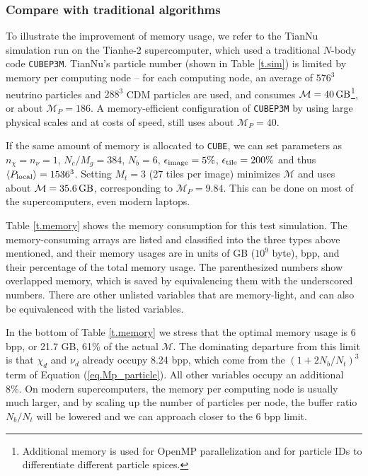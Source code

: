 \documentclass[10pt,twocolumn,preprint]{emulateapj}
\begin{document}
\subsubsection{Compare with traditional algorithms}
To illustrate the improvement of memory usage, we refer to the TianNu simulation \citep{2017NatAs...1E.143Y} run on the Tianhe-2 supercomputer, which used a traditional $N$-body code {\tt CUBEP3M}. TianNu's particle number (shown in Table \ref{t.sim}) is limited by memory per computing node -- for each computing node, an average of $576^3$ neutrino particles and $288^3$ CDM particles are used, and consumes $\mathcal{M}=40\,{\rm GB}$\footnote{Additional memory is used for OpenMP parallelization and for particle IDs to differentiate different particle spices.}, or about $\mathcal{M}_P=186$. A memory-efficient configuration of {\tt CUBEP3M} by using large physical scales and at costs of speed, still uses about $\mathcal{M}_P=40$.

If the same amount of memory is allocated to {\tt CUBE}, we can set parameters as $n_\chi=n_\nu=1$, $N_c/M_g=384$, $N_b=6$, $\epsilon_{\rm image}=5\%$, $\epsilon_{\rm tile}=200\%$ and thus $\left\langle P_{\rm local}\right\rangle=1536^3$. Setting $M_t=3$ (27 tiles per image) minimizes $\mathcal{M}$ and uses about $\mathcal{M}=35.6\,{\rm GB}$, corresponding to $\mathcal{M}_P=9.84$. This can be done on most of the supercomputers, even modern laptops.

Table \ref{t.memory} shows the memory consumption for this test simulation. The memory-consuming arrays are listed and classified into the three types above mentioned, and their memory usages are in units of GB ($10^9$ byte), bpp, and their percentage of the total memory usage. The parenthesized numbers show overlapped memory, which is saved by equivalencing them with the underscored numbers. There are other unlisted variables that are memory-light, and can also be equivalenced with the listed variables. 

In the bottom of Table \ref{t.memory} we stress that the optimal memory usage is 6 bpp, or 21.7 GB, 61\% of the actual $\mathcal{M}$. The dominating departure from this limit is that $\chi_d$ and $\nu_d$ already occupy 8.24 bpp, which come from the $(1+2N_b/N_t)^3$ term of Equation (\ref{eq.Mp_particle}). All other variables occupy an additional 8\%. On modern supercomputers, the memory per computing node is usually much larger, and by scaling up the number of particles per node, the buffer ratio $N_b/N_t$ will be lowered and we can approach closer to the 6 bpp limit.
\end{document}
